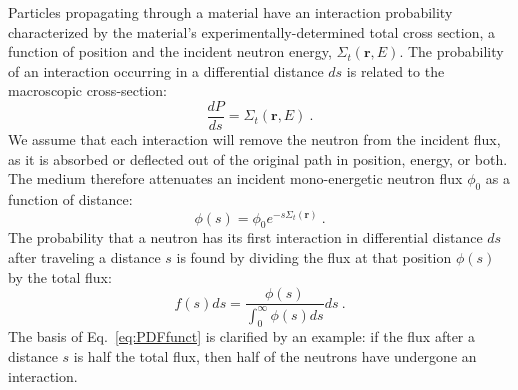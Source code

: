 Particles propagating through a material have an interaction
probability characterized by the material's experimentally-determined
total cross section, a function of position and the incident neutron
energy, $\Sigma_t(\mathbf{r}, E)$. The probability of an interaction
occurring in a differential distance $ds$ is related to the
macroscopic cross-section:
\begin{equation}
  \label{eq:macroscopic}
  \frac{dP}{ds} = \Sigma_t(\mathbf{r}, E)\:.
\end{equation}
We assume that each interaction will remove the neutron from the
incident flux, as it is absorbed or deflected out of the original path
in position, energy, or both.  The medium therefore attenuates
an incident mono-energetic neutron flux $\phi_0$ as a function of
distance:
\begin{equation}
  \label{eq:attenuation}
  \phi(s) = \phi_0 e^{-s\Sigma_t(\mathbf{r})}\:.
\end{equation}
The probability that a neutron has its first interaction in
differential distance $ds$ after
traveling a distance $s$ is found by dividing the flux at that
position $\phi(s)$ by the total flux:
\begin{equation}
  \label{eq:PDFfunct}
  f(s)ds = \frac{\phi(s)}{\int_0^\infty\phi(s)ds}ds\:.
\end{equation}
The basis of Eq.~\eqref{eq:PDFfunct} is clarified by an example: if
the flux after a distance $s$ is half the total flux, then half of the
neutrons have undergone an interaction.

